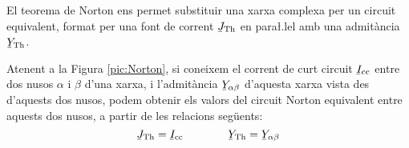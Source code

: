 El teorema de Norton ens permet substituir una xarxa complexa per un circuit equivalent, format per una font de corrent $\cmplx{J}\ped{Th}$ en para{\l.l}el amb una admit\`{a}ncia $\cmplx{Y}\ped{Th}$.

Atenent a la Figura \vref{pic:Norton}, si coneixem el corrent de
curt circuit $\cmplx{I}\ped{cc}$ entre dos nusos $\alpha$ i $\beta$
d'una xarxa, i l'admit\`{a}ncia $\cmplx{Y}_{\alpha\beta}$ d'aquesta
xarxa vista des d'aquests dos nusos, podem obtenir els valors del
circuit Norton equivalent entre aquests dos nusos, a partir de les
relacions seg\"{u}ents:
\begin{equation}
   \cmplx{J}\ped{Th} = \cmplx{I}\ped{cc} \qquad\qquad \cmplx{Y}\ped{Th} = \cmplx{Y}_{\alpha\beta}
\end{equation}


